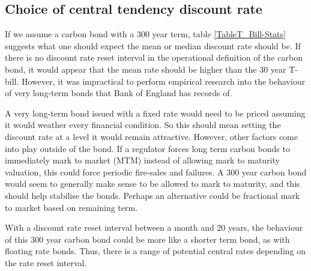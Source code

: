 \documentclass{article}
\begin{document}
\subsection{Choice of central tendency discount rate}

If we assume a carbon bond with a 300 year term, table \ref{TableT_Bill-Stats} suggests what one should expect the mean or median discount rate should be. If there is no discount rate reset interval in the operational definition of the carbon bond, it would appear that the mean rate should be higher than the 30 year T-bill. However, it was impractical to perform empirical research into the behaviour of very long-term bonds that Bank of England has records of. 

A very long-term bond issued with a fixed rate would need to be priced assuming it would weather every financial condition. So this should mean setting the discount rate at a level it would remain attractive. However, other factors come into play outside of the bond. If a regulator forces long term carbon bonds to immediately mark to market (MTM) instead of allowing mark to maturity valuation, this could force periodic fire-sales and failures. A 300 year carbon bond would seem to generally make sense to be allowed to mark to maturity, and this should help stabilise the bonds. Perhaps an alternative could be fractional mark to market based on remaining term.

With a discount rate reset interval between a month and 20 years, the behaviour of this 300 year carbon bond could be more like a shorter term bond, as with floating rate bonds. Thus, there is a range of potential central rates depending on the rate reset interval. 
\end{document}
